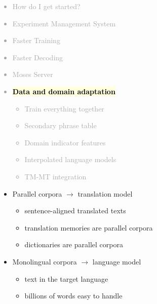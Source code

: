 \documentclass[landscape]{uedslides2C}
\newcommand{\currenttopic}[1]{\colorbox{lightyellow}{\textcolor{black}{\bf #1}}}
\begin{document}

\normalsize
\vspace{-5mm}
\textcolor{darkgrey}{
\small
\begin{itemize} \itemsep -1mm
\item {How do I get started?}
\item {Experiment Management System}
\item {Faster Training}
\item {Faster Decoding}
\item {Moses Server}
\item \currenttopic{Data and domain adaptation}
  \begin{itemize}\vspace{-4mm}
  \item Train everything together
  \item Secondary phrase table
\item Domain indicator features
\item Interpolated language models
  \item TM-MT integration
  \end{itemize}
\end{itemize}
}



\vspace{15mm}
\begin{itemize}
\item Parallel corpora $\rightarrow$ translation model
\begin{itemize}
\item sentence-aligned translated texts
\item translation memories are parallel corpora
\item dictionaries are parallel corpora
\end{itemize}
\item Monolingual corpora $\rightarrow$ language model
\begin{itemize}
\item text in the target language
\item billions of words easy to handle
\end{itemize}
\end{itemize}

\end{document}
